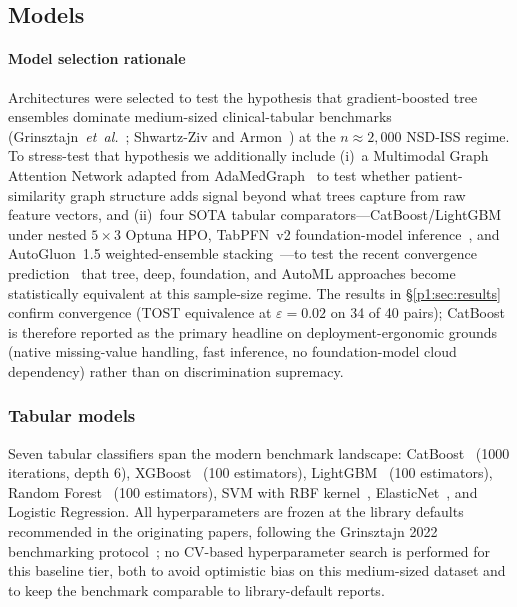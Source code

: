 \subsection{Models}

\paragraph*{Model selection rationale} Architectures were selected to test the hypothesis that gradient-boosted tree ensembles dominate medium-sized clinical-tabular benchmarks (Grinsztajn~\textit{et~al.}~\cite{grinsztajn2022}; Shwartz-Ziv and Armon~\cite{shwartzziv2022}) at the $n \approx 2{,}000$ NSD-ISS regime. To stress-test that hypothesis we additionally include (i)~a Multimodal Graph Attention Network adapted from AdaMedGraph~\cite{adamedgraph} to test whether patient-similarity graph structure adds signal beyond what trees capture from raw feature vectors, and (ii)~four SOTA tabular comparators---CatBoost/LightGBM under nested $5{\times}3$ Optuna HPO, TabPFN~v2 foundation-model inference~\cite{hollmann2025tabpfn}, and AutoGluon~1.5 weighted-ensemble stacking~\cite{erickson2020autogluon}---to test the recent convergence prediction~\cite{zabergja2024dltabular,ye2024closertabular} that tree, deep, foundation, and AutoML approaches become statistically equivalent at this sample-size regime. The results in \S\ref{p1:sec:results} confirm convergence (TOST equivalence at $\varepsilon{=}0.02$ on 34 of 40 pairs); CatBoost is therefore reported as the primary headline on deployment-ergonomic grounds (native missing-value handling, fast inference, no foundation-model cloud dependency) rather than on discrimination supremacy.

\subsubsection{Tabular models}
Seven tabular classifiers span the modern benchmark landscape: CatBoost~\cite{prokhorenkova2018catboost} (1000 iterations, depth 6), XGBoost~\cite{chen2016xgboost} (100 estimators), LightGBM~\cite{ke2017lightgbm} (100 estimators), Random Forest~\cite{breiman2001} (100 estimators), SVM with RBF kernel~\cite{cortes1995svm}, ElasticNet~\cite{zou2005elastic}, and Logistic Regression. All hyperparameters are frozen at the library defaults recommended in the originating papers, following the Grinsztajn 2022 benchmarking protocol~\cite{grinsztajn2022}; no CV-based hyperparameter search is performed for this baseline tier, both to avoid optimistic bias on this medium-sized dataset and to keep the benchmark comparable to library-default reports.

